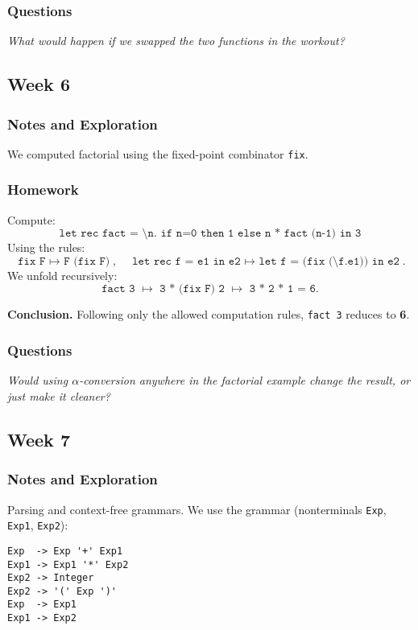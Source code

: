 \documentclass[11pt]{article}
\begin{document}
\subsubsection{Questions}
\emph{What would happen if we swapped the two functions in the workout?}

\subsection{Week 6}

\subsubsection{Notes and Exploration}
We computed factorial using the fixed-point combinator \texttt{fix}.

\subsubsection{Homework}
Compute:
\[
\texttt{let rec fact = \textbackslash n. if n=0 then 1 else n * fact (n-1) in 3}
\]
Using the rules:
\[
\texttt{fix F $\mapsto$ F (fix F)}, \quad
\texttt{let rec f = e1 in e2 $\mapsto$ let f = (fix (\textbackslash f.e1)) in e2}.
\]
We unfold recursively:
\[
\texttt{fact 3 $\mapsto$ 3 * (fix F) 2 $\mapsto$ 3 * 2 * 1 = 6}.
\]

\textbf{Conclusion.}  
Following only the allowed computation rules, \texttt{fact 3} reduces to \textbf{6}.

\subsubsection{Questions}
\emph{Would using $\alpha$-conversion anywhere in the factorial example change the result, or just make it cleaner?}

\subsection{Week 7}

\subsubsection{Notes and Exploration}
Parsing and context-free grammars. We use the grammar (nonterminals \texttt{Exp}, \texttt{Exp1}, \texttt{Exp2}):

\begin{verbatim}
Exp  -> Exp '+' Exp1
Exp1 -> Exp1 '*' Exp2
Exp2 -> Integer
Exp2 -> '(' Exp ')'
Exp  -> Exp1
Exp1 -> Exp2
\end{verbatim}
\end{document}
